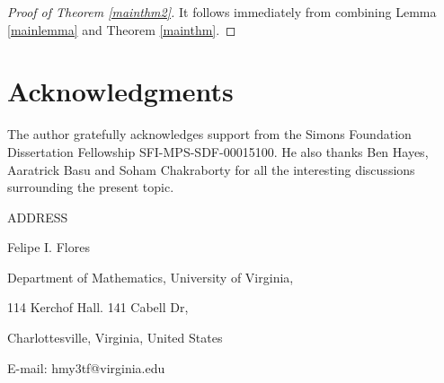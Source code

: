\documentclass[11pt]{article}
\theoremstyle{definition}
\theoremstyle{remark}
\numberwithin{equation}{section}
\numberwithin{equation}{section}
\numberwithin{equation}{section}
\begin{document}
\begin{proof}[Proof of Theorem \ref{mainthm2}]
    It follows immediately from combining Lemma \ref{mainlemma} and Theorem \ref{mainthm}.
\end{proof}


\section*{Acknowledgments}

The author gratefully acknowledges support from the Simons Foundation Dissertation Fellowship SFI-MPS-SDF-00015100. He also thanks Ben Hayes, Aaratrick Basu and Soham Chakraborty for all the interesting discussions surrounding the present topic. 




\printbibliography

\bigskip
\bigskip
ADDRESS



\smallskip
\smallskip
Felipe I. Flores

Department of Mathematics, University of Virginia,

114 Kerchof Hall. 141 Cabell Dr,

Charlottesville, Virginia, United States

E-mail: hmy3tf@virginia.edu
\end{document}
